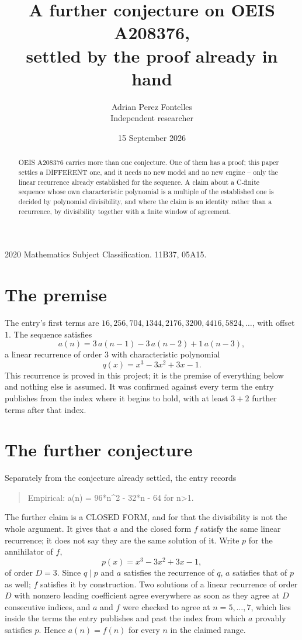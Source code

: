\documentclass[11pt,a4paper]{article}
\title{A further conjecture on OEIS A208376,\\ \large settled by the proof already in hand}
\author{Adrian Perez Fontelles\\ \small Independent researcher}
\date{15 September 2026}
\theoremstyle{plain}
\theoremstyle{definition}
\begin{document}
\maketitle

\begin{abstract}
OEIS A208376 carries more than one conjecture. One of them has a proof; this paper settles a
DIFFERENT one, and it needs no new model and no new engine -- only the linear recurrence already
established for the sequence. A claim about a C-finite sequence whose own characteristic
polynomial is a multiple of the established one is decided by polynomial divisibility, and where
the claim is an identity rather than a recurrence, by divisibility together with a finite window
of agreement.
\end{abstract}

\noindent\small 2020 Mathematics Subject Classification. 11B37, 05A15.\normalsize

\section{The premise}

The entry's first terms are $16, 256, 704, 1344, 2176, 3200, 4416, 5824,\dots$, with offset $1$. The sequence satisfies
\[
  a(n)=3\,a(n-1) - 3\,a(n-2) + 1\,a(n-3) ,
\]
a linear recurrence of order $3$ with characteristic polynomial
\[
  q(x)=x^{3} - 3 x^{2} + 3 x - 1 .
\]
This recurrence is proved in this project; it is the premise of everything below and nothing else is assumed.
It was confirmed against every term the entry publishes from the index where it begins to hold,
with at least $3+2$ further terms after that index.

\section{The further conjecture}

Separately from the conjecture already settled, the entry records

\begin{quote}\raggedright Empirical: a(n) = 96*n\^{}2 - 32*n - 64 for n>1.\end{quote}

The further claim is a CLOSED FORM, and for that the divisibility is not the whole argument. It
gives that $a$ and the closed form $f$ satisfy the same linear recurrence; it does not say they
are the same solution of it. Write $p$ for the annihilator of $f$,
\[
  p(x)=x^{3} - 3 x^{2} + 3 x - 1 ,
\]
of order $D=3$. Since $q\mid p$ and $a$ satisfies the recurrence of $q$, $a$ satisfies that of
$p$ as well; $f$ satisfies it by construction. Two solutions of a linear recurrence of order $D$
with nonzero leading coefficient agree everywhere as soon as they agree at $D$ consecutive
indices, and $a$ and $f$ were checked to agree at $n=5,\dots,7$,
which lies inside the terms the entry publishes and past the index from which $a$ provably
satisfies $p$. Hence $a(n)=f(n)$ for every $n$ in the claimed range.
\end{document}
